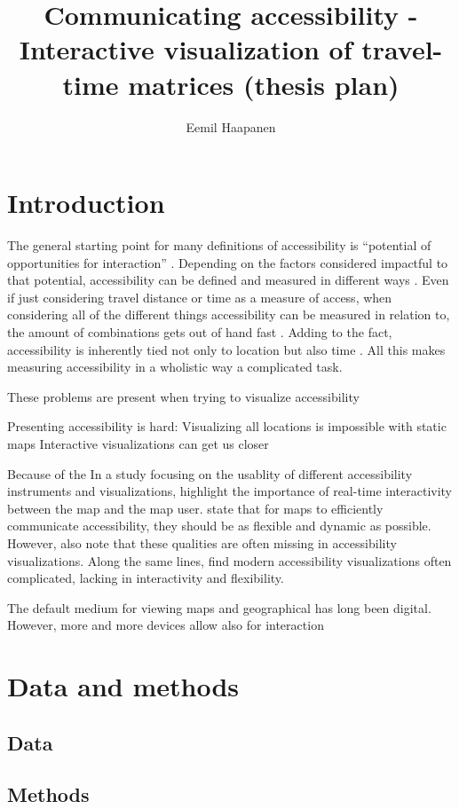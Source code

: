 \documentclass{article}
\title{Communicating accessibility - Interactive visualization of travel-time matrices (thesis  plan)}
\author{Eemil Haapanen}
\begin{document}
\maketitle

\section{Introduction}

The general starting point for many definitions of accessibility is
\enquote{potential of opportunities for interaction} \parencite{han1959}.
Depending on the factors considered impactful to that potential,
accessibility can be defined and measured in different ways \parencite{pap2016}.
Even if just considering travel distance or time as a measure of access,
when considering all of the different things accessibility can be measured in relation to,
the amount of combinations gets out of hand fast \parencite{lev2020}.
Adding to the fact, accessibility is inherently tied not only to location
but also time \parencite{jar2018}.
All this makes measuring accessibility in a wholistic way a complicated task.

These problems are present when trying to visualize accessibility 

Presenting accessibility is hard:
Visualizing all locations is impossible with static maps
Interactive visualizations can get us closer

Because of the 
In a study focusing on the usablity of different accessibility instruments and visualizations,  %
\textcite{te2014} highlight the importance of real-time interactivity between the map and the map user.
\textcite{but2018} state that for maps to efficiently communicate accessibility,
they should be as flexible and dynamic as possible.
However, \citeauthor{but2018} also note that these qualities are often missing in accessibility visualizations.
Along the same lines, \textcite{paj2021} find modern accessibility visualizations often complicated,
lacking in interactivity and flexibility.


The default medium for viewing maps and geographical has long been digital.  %
However, more and more devices allow also for interaction \parencite{mei2019}



\section{Data and methods}

\subsection{Data}

\subsection{Methods}

\printbibliography
\end{document}
